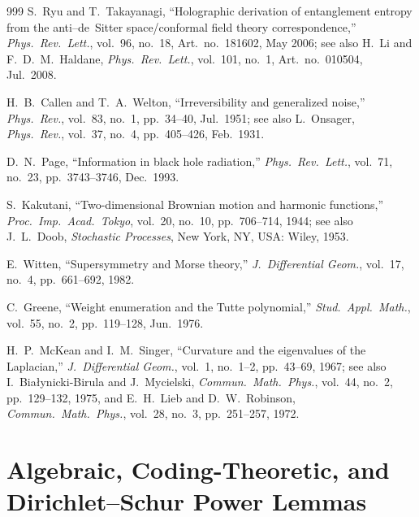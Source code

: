 \documentclass[11pt,letterpaper]{article}
\theoremstyle{spectralthm}
\begin{document}
\begin{thebibliography}{999}
S.~Ryu and T.~Takayanagi, ``Holographic derivation of entanglement entropy from the anti--de~Sitter space/conformal field theory correspondence,'' \emph{Phys.\ Rev.\ Lett.}, vol.~96, no.~18, Art.\ no.~181602, May 2006; see also H.~Li and F.~D.~M.~Haldane, \emph{Phys.\ Rev.\ Lett.}, vol.~101, no.~1, Art.\ no.~010504, Jul.\ 2008.

H.~B.~Callen and T.~A.~Welton, ``Irreversibility and generalized noise,'' \emph{Phys.\ Rev.}, vol.~83, no.~1, pp.~34--40, Jul.\ 1951; see also L.~Onsager, \emph{Phys.\ Rev.}, vol.~37, no.~4, pp.~405--426, Feb.\ 1931.

D.~N.~Page, ``Information in black hole radiation,'' \emph{Phys.\ Rev.\ Lett.}, vol.~71, no.~23, pp.~3743--3746, Dec.\ 1993.

S.~Kakutani, ``Two-dimensional Brownian motion and harmonic functions,'' \emph{Proc.\ Imp.\ Acad.\ Tokyo}, vol.~20, no.~10, pp.~706--714, 1944; see also J.~L.~Doob, \emph{Stochastic Processes}, New York, NY, USA: Wiley, 1953.

E.~Witten, ``Supersymmetry and Morse theory,'' \emph{J.\ Differential Geom.}, vol.~17, no.~4, pp.~661--692, 1982.

C.~Greene, ``Weight enumeration and the Tutte polynomial,'' \emph{Stud.\ Appl.\ Math.}, vol.~55, no.~2, pp.~119--128, Jun.\ 1976.

H.~P.~McKean and I.~M.~Singer, ``Curvature and the eigenvalues of the Laplacian,'' \emph{J.\ Differential Geom.}, vol.~1, no.~1--2, pp.~43--69, 1967; see also I.~Bia\l{}ynicki-Birula and J.~Mycielski, \emph{Commun.\ Math.\ Phys.}, vol.~44, no.~2, pp.~129--132, 1975, and E.~H.~Lieb and D.~W.~Robinson, \emph{Commun.\ Math.\ Phys.}, vol.~28, no.~3, pp.~251--257, 1972.

\end{thebibliography}

\clearpage
\appendix

\section{Algebraic, Coding-Theoretic, and Dirichlet--Schur Power Lemmas}
\label{sec:appendix}
\end{document}
